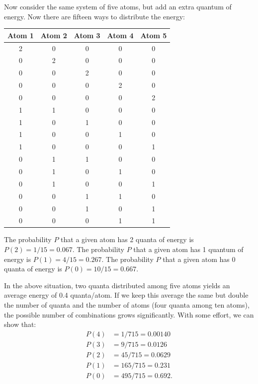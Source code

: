 Now consider the same system of five atoms, but add an extra quantum of energy.  Now there are fifteen ways to distribute the energy:
\begin{table}[htb]
\begin{center}
\begin{tabular}{ccccc}
\hline
Atom 1 & Atom 2 & Atom 3 & Atom 4 & Atom 5 \\
\hline
2 &	0 &	0 &	0 &	0\\
0 &	2 &	0 &	0 &	0\\
0 &	0 &	2 &	0 &	0\\
0 &	0 &	0 &	2 &	0\\
0 &	0 &	0 &	0 &	2\\
1 &	1 &	0 &	0 &	0\\
1 &	0 &	1 &	0 &	0\\
1 &	0 &	0 &	1 &	0\\
1 &	0 &	0 &	0 &	1\\
0 &	1 &	1 &	0 &	0\\
0 &	1 &	0 &	1 &	0\\
0 &	1 &	0 &	0 &	1\\
0 &	0 &	1 &	1 &	0\\
0 &	0 &	1 &	0 &	1\\
0 &	0 &	0 &	1 &	1\\
\hline
\end{tabular}
\label{table8-2}
\end{center}
\end{table}
The probability $P$ that a given atom has 2 quanta of energy is $P(2) = 1/15 = 0.067$. The probability $P$ that a given atom has 1 quantum of energy is $P(1) = 4/15 = 0.267$. The probability $P$ that a given atom has 0 quanta of energy is $P(0) = 10/15 = 0.667$.

In the above situation, two quanta distributed among five atoms yields an average energy of 0.4 quanta/atom.  If we keep this average the same but double the number of quanta and the number of atoms (four quanta among ten atoms), the possible number of combinations grows significantly.  With some effort, we can show that:
\begin{align}
P(4) &= 1/715 = 0.00140\nonumber\\
P(3) &= 9/715 = 0.0126\nonumber\\
P(2) &= 45/715 = 0.0629\nonumber\\
P(1) &= 165/715 = 0.231\nonumber\\
P(0) &= 495/715 = 0.692.\nonumber
\end{align}

